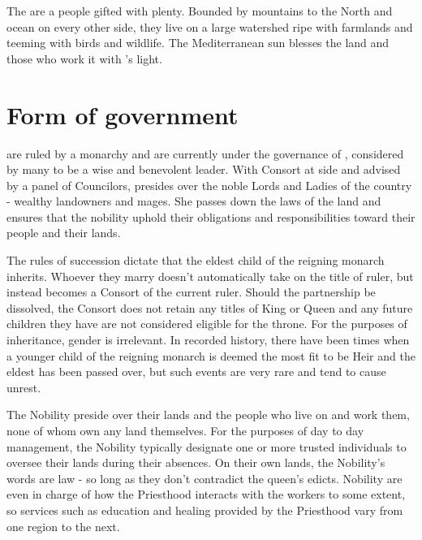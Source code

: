 \documentclass[blue]{GL2020}
\begin{document}
\name{\bAgrarians{}}



The \pFarmers{} are a people gifted with plenty.  Bounded by mountains to the North and ocean on every other side, they live on a large watershed ripe with farmlands and teeming with birds and wildlife.  The Mediterranean sun blesses the land and those who work it with \cFarmGod{}’s light.   

\section*{Form of government}

\pFarm{} are ruled by a monarchy and are currently under the governance of \cQueen{\full}, considered by many to be a wise and benevolent leader.  With \cQueen{\their} Consort at \cQueen{\their} side and advised by a panel of Councilors, \cQueen{\they} presides over the noble Lords and Ladies of the country - wealthy landowners and mages.  She passes down the laws of the land and ensures that the nobility uphold their obligations and responsibilities toward their people and their lands.

The rules of succession dictate that the eldest child of the reigning monarch inherits.  Whoever they marry doesn't automatically take on the title of ruler, but instead becomes a Consort of the current ruler. Should the partnership be dissolved, the Consort does not retain any titles of King or Queen and any future children they have are not considered eligible for the throne.  For the purposes of inheritance, gender is irrelevant.  In recorded history, there have been times when a younger child of the reigning monarch is deemed the most fit to be Heir and the eldest has been passed over, but such events are very rare and tend to cause unrest.

The Nobility preside over their lands and the people who live on and work them, none of whom own any land themselves.  For the purposes of day to day management, the Nobility typically designate one or more trusted individuals to oversee their lands during their absences.  On their own lands, the Nobility's words are law - so long as they don't contradict the queen's edicts.  Nobility are even in charge of how the Priesthood interacts with the workers to some extent, so services such as education and healing provided by the Priesthood vary from one region to the next.
\end{document}
